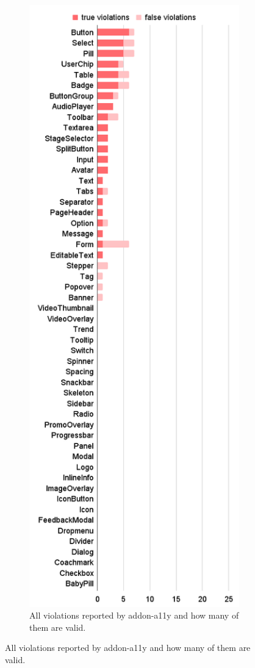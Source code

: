 \documentclass{master_thesis}
\begin{document}
\begin{figure}[H]
	\begin{subfigure}{0.45\textwidth}
	\includegraphics[height=0.9\textheight]{img/audit-failed.png}
	\caption{All violations reported by addon-a11y and how many of them are valid.}

\end{subfigure}
\end{figure}
\end{document}
